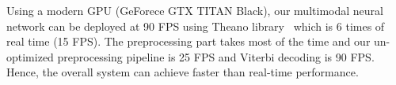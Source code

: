 Using a modern GPU (GeForece GTX TITAN Black), our multimodal neural network can be deployed at 90 FPS using Theano library~\cite{Bastien-Theano-2012} which is 6 times of real time (15 FPS). The preprocessing part takes most of the time and our un-optimized preprocessing pipeline is 25 FPS and Viterbi decoding is 90 FPS. Hence, the overall system can achieve faster than real-time performance.





\endinput
